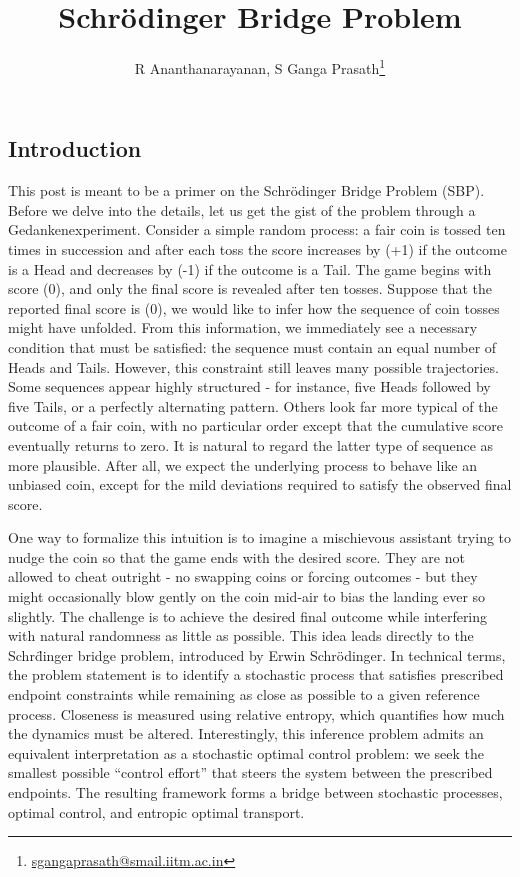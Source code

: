 \documentclass[12pt]{article}
\title{Schr\"odinger Bridge Problem}
\author{R Ananthanarayanan, S Ganga Prasath\thanks{\href{mailto:sgangaprasath@smail.iitm.ac.in}{sgangaprasath@smail.iitm.ac.in}}}
\date{}
\begin{document}
\maketitle
\begin{singlespace}
\section{Introduction}
This post is meant to be a primer on the Schr\"odinger Bridge Problem (SBP). Before we delve into the details, let us get the gist of the problem through a Gedankenexperiment. Consider a simple random process: a fair coin is tossed ten times in succession and after each toss the score increases by (+1) if the outcome is a Head and decreases by (-1) if the outcome is a Tail. The game begins with score (0), and only the final score is revealed after ten tosses. Suppose that the reported final score is (0), we would like to infer how the sequence of coin tosses might have unfolded. From this information, we immediately see a necessary condition that must be satisfied: the sequence must contain an equal number of Heads and Tails. However, this constraint still leaves many possible trajectories. Some sequences appear highly structured - for instance, five Heads followed by five Tails, or a perfectly alternating pattern. Others look far more typical of the outcome of a fair coin, with no particular order except that the cumulative score eventually returns to zero. It is natural to regard the latter type of sequence as more plausible. After all, we expect the underlying process to behave like an unbiased coin, except for the mild deviations required to satisfy the observed final score.

One way to formalize this intuition is to imagine a mischievous assistant trying to nudge the coin so that the game ends with the desired score. They are not allowed to cheat outright - no swapping coins or forcing outcomes - but they might occasionally blow gently on the coin mid-air to bias the landing ever so slightly. The challenge is to achieve the desired final outcome while interfering with natural randomness as little as possible. This idea leads directly to the Schr\"dinger bridge problem, introduced by Erwin Schr\"odinger. In technical terms, the problem statement is to identify a stochastic process that satisfies prescribed endpoint constraints while remaining as close as possible to a given reference process. Closeness is measured using relative entropy, which quantifies how much the dynamics must be altered. Interestingly, this inference problem admits an equivalent interpretation as a stochastic optimal control problem: we seek the smallest possible ``control effort'' that steers the system between the prescribed endpoints. The resulting framework forms a bridge between stochastic processes, optimal control, and entropic optimal transport.\\


\end{singlespace}
\end{document}
